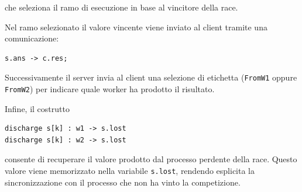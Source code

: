 che seleziona il ramo di esecuzione in base al vincitore della race.

Nel ramo selezionato il valore vincente viene inviato al client tramite una comunicazione:

\begin{tcolorbox}[colback=white,colframe=black!35,boxrule=0.4pt]
\begin{lstlisting}
s.ans -> c.res;
\end{lstlisting}
\end{tcolorbox}

Successivamente il server invia al client una selezione di etichetta (\texttt{FromW1} oppure \texttt{FromW2}) per indicare quale worker ha prodotto il risultato.

Infine, il costrutto

\begin{tcolorbox}[colback=white,colframe=black!35,boxrule=0.4pt]
\begin{lstlisting}
discharge s[k] : w1 -> s.lost
discharge s[k] : w2 -> s.lost
\end{lstlisting}
\end{tcolorbox}

consente di recuperare il valore prodotto dal processo perdente della race. Questo valore viene memorizzato nella variabile \texttt{s.lost}, rendendo esplicita la sincronizzazione con il processo che non ha vinto la competizione.